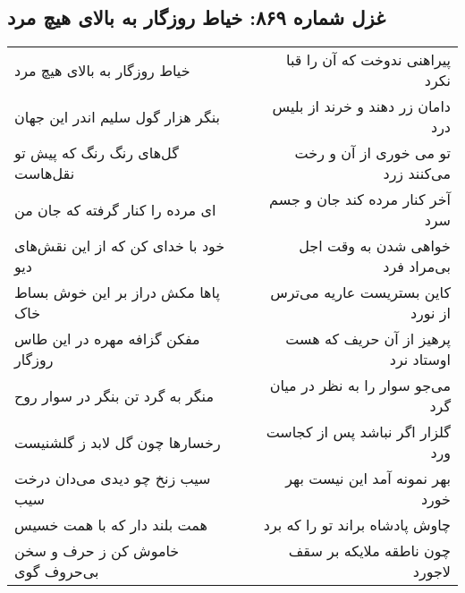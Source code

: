 \begin{center}
\section*{غزل شماره ۸۶۹: خیاط روزگار به بالای هیچ مرد}
\label{sec:0869}
\begin{longtable}{l p{0.5cm} r}
خیاط روزگار به بالای هیچ مرد
&&
پیراهنی ندوخت که آن را قبا نکرد
\\
بنگر هزار گول سلیم اندر این جهان
&&
دامان زر دهند و خرند از بلیس درد
\\
گل‌های رنگ رنگ که پیش تو نقل‌هاست
&&
تو می خوری از آن و رخت می‌کنند زرد
\\
ای مرده را کنار گرفته که جان من
&&
آخر کنار مرده کند جان و جسم سرد
\\
خود با خدای کن که از این نقش‌های دیو
&&
خواهی شدن به وقت اجل بی‌مراد فرد
\\
پاها مکش دراز بر این خوش بساط خاک
&&
کاین بستریست عاریه می‌ترس از نورد
\\
مفکن گزافه مهره در این طاس روزگار
&&
پرهیز از آن حریف که هست اوستاد نرد
\\
منگر به گرد تن بنگر در سوار روح
&&
می‌جو سوار را به نظر در میان گرد
\\
رخسارها چون گل لابد ز گلشنیست
&&
گلزار اگر نباشد پس از کجاست ورد
\\
سیب زنخ چو دیدی می‌دان درخت سیب
&&
بهر نمونه آمد این نیست بهر خورد
\\
همت بلند دار که با همت خسیس
&&
چاوش پادشاه براند تو را که برد
\\
خاموش کن ز حرف و سخن بی‌حروف گوی
&&
چون ناطقه ملایکه بر سقف لاجورد
\\
\end{longtable}
\end{center}
